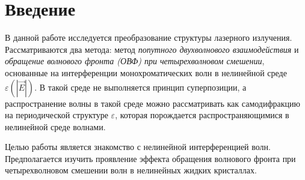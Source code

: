 \section*{Введение}
В данной работе исследуется преобразование структуры лазерного излучения. Рассматриваются два метода: метод \textit{попутного двухволнового взаимодействия} и \textit{обращение волнового фронта (ОВФ) при четырехволновом смешении}, основанные на интерференции монохроматических волн в нелинейной среде $\varepsilon(|\vec{E}|)$. В такой среде не выполняется принцип суперпозиции, а распространение волны в такой среде можно рассматривать как самодифракцию на периодической структуре $\varepsilon$, которая порождается распространяющимися в нелинейной среде волнами. 

Целью работы является знакомство с нелинейной интерференцией волн. Предполагается изучить проявление эффекта обращения волнового фронта при четырехволновом смешении волн в нелинейных жидких кристаллах.

